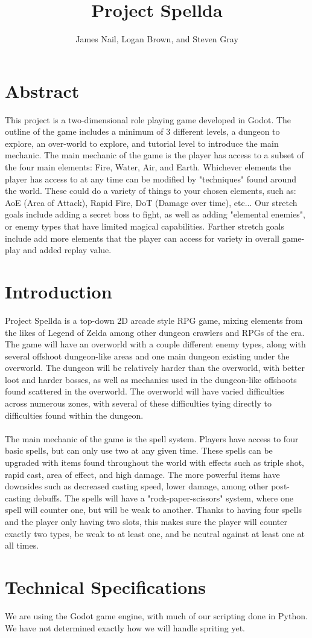 \documentclass[12pt]{article}
\title{Project Spellda}
\author{James Nail, Logan Brown, and Steven Gray}
\begin{document}
	\maketitle
\newpage
	\section*{Abstract}
	This project is a two-dimensional role playing game developed in Godot. The outline of the game includes a minimum of 3 different
	levels, a dungeon to explore, an over-world to explore, and tutorial level to introduce the main mechanic. The main mechanic of 
	the game is the player has access to a subset of the four main elements: Fire, Water, Air, and Earth. Whichever elements the
	player has access to at any time can be modified by "techniques" found around the world. These could do a variety of things
	to your chosen elements, such as: AoE (Area of Attack), Rapid Fire, DoT (Damage over time), etc...
	Our stretch goals include adding a secret boss to fight, as well as adding "elemental enemies", or enemy types that
	have limited magical capabilities. Farther stretch goals include add more elements that the player can access for
	variety in overall game-play and added replay value.
\newpage
	\section*{Introduction}
	Project Spellda is a top-down 2D arcade style RPG game, mixing elements from the likes of Legend of Zelda among other dungeon crawlers
	and RPGs of the era.  The game will have an overworld with a couple different enemy types, along with several offshoot dungeon-like areas
	and one main dungeon existing under the overworld.  The dungeon will be relatively harder than the overworld, with better loot and harder
	bosses, as well as mechanics used in the dungeon-like offshoots found scattered in the overworld.  The overworld will have varied difficulties
	across numerous zones, with several of these difficulties tying directly to difficulties found within the dungeon.\\\\
	
	The main mechanic of the game is the spell system.  Players have access to four basic spells, but can only use two at any given time.  
	These spells can be upgraded with items found throughout the world with effects such as triple shot, rapid cast, area of effect, and high 
	damage.  The more powerful items have downsides such as decreased casting speed, lower damage, among other post-casting debuffs.  The spells
	will have a "rock-paper-scissors" system, where one spell will counter one, but will be weak to another.  Thanks to having four spells and
	the player only having two slots, this makes sure the player will counter exactly two types, be weak to at least one, and be neutral against
	at least one at all times.
	
\newpage
	\section*{Technical Specifications}
	We are using the Godot game engine, with much of our scripting done in Python.  We have not determined exactly how we will handle spriting yet.
\end{document}
